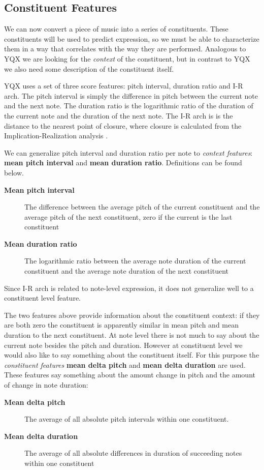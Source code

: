 \documentclass[a4paper,10pt]{article}
\begin{document}
\subsection{Constituent Features}
\label{sec:scorefeatures}

We can now convert a piece of music into a series of constituents. These constituents will be used to predict expression, so we must be able to characterize them in a way that correlates with the way they are performed. Analogous to YQX we are looking for the \textit{context} of the constituent, but in contrast to YQX we also need some description of the constituent itself.

YQX uses a set of three score features: pitch interval, duration ratio and I-R arch. The pitch interval is simply the difference in pitch between the current note and the next note. The duration ratio is the logarithmic ratio of the duration of the current note and the duration of the next note.  The I-R arch is is the distance to the nearest point of closure, where closure is calculated from the Implication-Realization analysis \cite{narmour1990analysis}. 

We can generalize pitch interval and duration ratio per note to \textit{context features}: \textbf{mean pitch interval} and \textbf{mean duration ratio}. Definitions can be found below. 
\begin{description}
\item[\textbf{Mean pitch interval}] 
The difference between the average pitch of the current constituent and the average pitch of the next constituent, zero if the current is the last constituent
\item[\textbf{Mean duration ratio}]
The logarithmic ratio between the average note duration of the current constituent and the average note duration of the next constituent
\end{description}

Since I-R arch is related to note-level expression, it does not generalize well to a constituent level feature. 

The two features above provide information about the constituent context: if they are both zero the constituent is apparently similar in mean pitch and mean duration to the next constituent. At note level there is not much to say about the current note besides the pitch and duration. However at constituent level we would also like to say something about the constituent itself. For this purpose the \textit{constituent features} \textbf{mean delta pitch} and \textbf{mean delta duration} are used. These features say something about the amount change in pitch and the amount of change in note duration:
\begin{description}
\item[\textbf{Mean delta pitch}] The average of all absolute pitch intervals within one constituent. 
\item[\textbf{Mean delta duration}] The average of all absolute differences in duration of succeeding notes within one constituent
\end{description}
\end{document}
